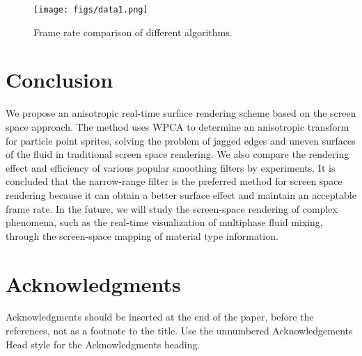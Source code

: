 \documentclass[times,twocolumn,final]{elsarticle}
\begin{document}
\begin{figure}[!t]
    \centering
    \texttt{[image: figs/data1.png]}
    \caption{Frame rate comparison of different algorithms.}
    \label{fig:figure8}
\end{figure}

\section{Conclusion}
We propose an anisotropic real-time surface rendering scheme based on the screen space approach. The method uses WPCA to determine an anisotropic transform for particle point sprites, solving the problem of jagged edges and uneven surfaces of the fluid in traditional screen space rendering. We also compare the rendering effect and efficiency of various popular smoothing filters by experiments. It is concluded that the narrow-range filter is the preferred method for screen space rendering because it can obtain a better surface effect and maintain an acceptable frame rate. In the future, we will study the screen-space rendering of complex phenomena, such as the real-time visualization of multiphase fluid mixing, through the screen-space mapping of material type information.


\section*{Acknowledgments}
Acknowledgments should be inserted at the end of the paper, before the
references, not as a footnote to the title. Use the unnumbered
Acknowledgements Head style for the Acknowledgments heading.






\end{document}
